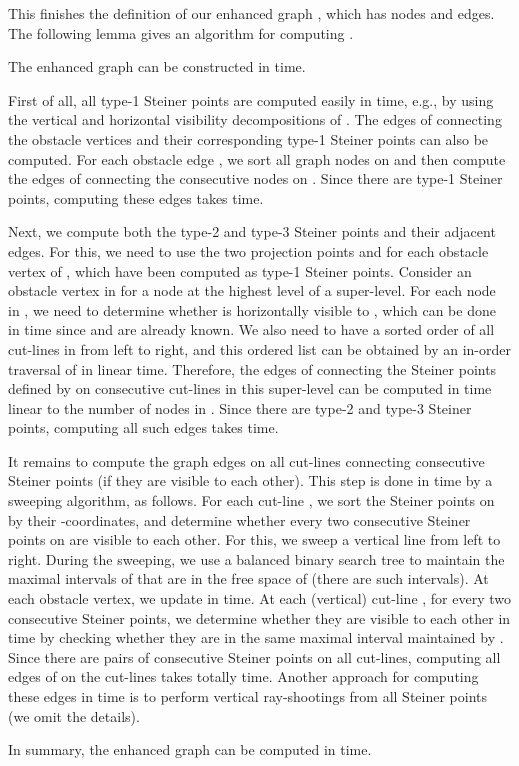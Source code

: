 \documentclass[english,runningheads,11pt]{llncs}
\newenvironment{proof}{\noindent {\textbf{Proof:}}\rm}{\hfill \rm}
\begin{document}
This finishes the definition of our enhanced graph , which has
 nodes and 
edges. The following lemma gives an algorithm for computing .

\begin{lemma}\label{lem:10}
The enhanced graph  can be constructed
in  time.
\end{lemma}
\begin{proof}
First of all, all type-1 Steiner points are
computed easily in  time, e.g., by using the vertical and horizontal visibility decompositions of . The edges of  connecting the obstacle vertices and their
corresponding type-1 Steiner points can also be computed. For each obstacle
edge , we sort all graph nodes on  and then
compute the edges of  connecting the consecutive nodes on . Since
there are  type-1 Steiner points, computing these
edges takes  time.

Next, we compute both the type-2 and type-3 Steiner points and their adjacent
edges. For this, we need to use the two projection
points  and  for each obstacle vertex  of , which have been computed as type-1 Steiner points.
Consider an obstacle vertex  in  for a
node  at the highest level of a super-level. For each node  in
, we need to determine whether  is horizontally
visible to , which can be done in  time since 
and  are already known. We also need to have a sorted order of all
cut-lines in  from left to right, and this ordered list
can be obtained by an in-order traversal of  in linear
time. Therefore, the edges of  connecting the Steiner points defined by  on
consecutive cut-lines in this super-level can be computed in time linear to the number of nodes in .
Since there are  type-2 and type-3
Steiner points, computing all such edges takes  time.

It remains to compute the graph edges on all cut-lines connecting consecutive Steiner
points (if they are visible to each other).
This step is done in  time by a
sweeping algorithm, as follows. For each cut-line , we sort
the Steiner points on  by their -coordinates, and
determine whether every two consecutive Steiner points on  are visible to
each other. For this, we sweep a vertical line  from left to right.
During the sweeping, we use a balanced binary search tree  to maintain
the maximal intervals of  that are in the free space of  (there are  such intervals).
At each obstacle vertex, we
update  in  time. At each (vertical) cut-line ,
for every two consecutive Steiner points, we determine whether they
are visible to each other in  time by checking whether they
are in the same maximal interval maintained by . Since
there are  pairs of consecutive
Steiner points on all cut-lines, computing all edges of  on the cut-lines takes
totally  time. Another
approach for computing these edges in  time is to perform vertical ray-shootings from all Steiner
points (we omit the details).

In summary, the enhanced graph  can be computed in
 time.
\end{proof}
\end{document}
